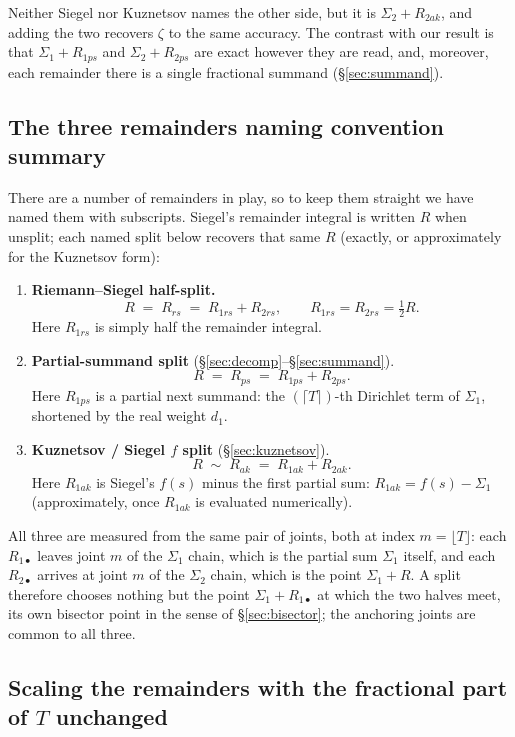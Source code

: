 \documentclass[11pt]{article}
\theoremstyle{definition}
\begin{document}
Neither Siegel
nor Kuznetsov names the other side, but it is $\Sigma_2+R_{2ak}$, and adding the
two recovers $\zeta$ to the same accuracy. The contrast with our result is that
$\Sigma_1+R_{1ps}$ and $\Sigma_2+R_{2ps}$ are exact however they are read, and,
moreover, each remainder there is a single fractional summand
(\S\ref{sec:summand}).

\subsection{The three remainders naming convention summary}\label{sec:remainders-summary}

There are a number of remainders in play, so to keep them straight we have named
them with subscripts. Siegel's remainder integral is written $R$ when unsplit; each
named split below recovers that same $R$ (exactly, or approximately for the
Kuznetsov form):
\begin{enumerate}
\item \textbf{Riemann--Siegel half-split.}
\[
R \;=\; R_{rs} \;=\; R_{1rs}+R_{2rs},
\qquad
R_{1rs}=R_{2rs}=\tfrac12 R.
\]
Here $R_{1rs}$ is simply half the remainder integral.
\item \textbf{Partial-summand split} (\S\ref{sec:decomp}--\S\ref{sec:summand}).
\[
R \;=\; R_{ps} \;=\; R_{1ps}+R_{2ps}.
\]
Here $R_{1ps}$ is a partial next summand: the $(\lceil T\rceil)$-th Dirichlet
term of $\Sigma_1$, shortened by the real weight $d_1$.
\item \textbf{Kuznetsov / Siegel $f$ split} (\S\ref{sec:kuznetsov}).
\[
R \;\sim\; R_{ak} \;=\; R_{1ak}+R_{2ak}.
\]
Here $R_{1ak}$ is Siegel's $f(s)$ minus the first partial sum:
$R_{1ak}=f(s)-\Sigma_1$ (approximately, once $R_{1ak}$ is evaluated
numerically).
\end{enumerate}

All three are measured from the same pair of joints, both at index
$m=\lfloor T\rfloor$: each $R_{1\bullet}$ leaves joint $m$ of the $\Sigma_1$
chain, which is the partial sum $\Sigma_1$ itself, and each $R_{2\bullet}$
arrives at joint $m$ of the $\Sigma_2$ chain, which is the point $\Sigma_1+R$.
A split therefore chooses nothing but the point $\Sigma_1+R_{1\bullet}$ at which
the two halves meet, its own bisector point in the sense of
\S\ref{sec:bisector}; the anchoring joints are common to all three.

\subsection{Scaling the remainders with the fractional part of \texorpdfstring{$T$}{T} unchanged}\label{sec:remainder-scaling}
\end{document}
